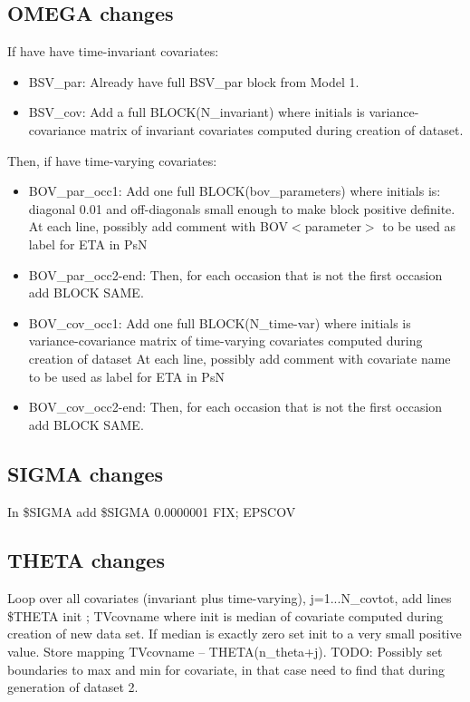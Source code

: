 \subsection{OMEGA changes}
If have have time-invariant covariates:
\begin{itemize}
\item BSV\_par: Already have full BSV\_par block from Model 1.
\item BSV\_cov: Add a full BLOCK(N\_invariant) where initials is variance-covariance matrix of invariant covariates computed during creation of dataset.
\end{itemize}
\noindent 
Then, if have time-varying covariates:
\begin{itemize}
\item BOV\_par\_occ1: Add one full BLOCK(bov\_parameters) where initials is: diagonal 0.01 and off-diagonals small enough to make
block positive definite.
At each line, possibly add comment with BOV$<$parameter$>$ to be used as label for ETA in PsN
\item BOV\_par\_occ2-end: Then, for each occasion that is not the first occasion add BLOCK SAME.
\item BOV\_cov\_occ1: Add one full BLOCK(N\_time-var) where initials is variance-covariance matrix of time-varying covariates computed during creation of dataset
At each line, possibly add comment with covariate name to be used as label for ETA in PsN
\item BOV\_cov\_occ2-end: Then, for each occasion that is not the first occasion add BLOCK SAME.
\end{itemize}
\subsection{SIGMA changes}
In \$SIGMA add 
\$SIGMA 0.0000001 FIX; EPSCOV

\subsection{THETA changes}
Loop over all covariates (invariant plus time-varying), j=1...N\_covtot, add lines
\$THETA init ; TVcovname
where init is median of covariate computed during creation of new data set. If median is exactly zero set
init to a very small positive value. 
Store mapping TVcovname – THETA(n\_theta+j). 
TODO: Possibly set boundaries to max and min for covariate, in that case need to find that during generation of dataset 2.

